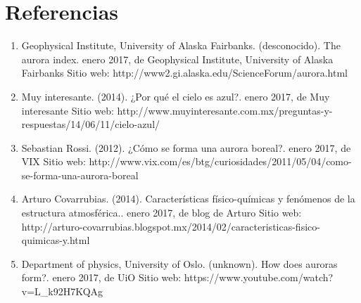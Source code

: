\documentclass{article}
\begin{document}
\section{Referencias}
\begin{doublespace}
\begin{enumerate}

\item Geophysical Institute, University of Alaska Fairbanks. (desconocido). The aurora index. enero 2017, de Geophysical Institute, University of Alaska Fairbanks Sitio web: http://www2.gi.alaska.edu/ScienceForum/aurora.html


\item Muy interesante. (2014). ¿Por qué el cielo es azul?. enero 2017, de Muy interesante Sitio web: http://www.muyinteresante.com.mx/preguntas-y-respuestas/14/06/11/cielo-azul/

\item Sebastian Rossi. (2012). ¿Cómo se forma una aurora boreal?. enero 2017, de VIX Sitio web: http://www.vix.com/es/btg/curiosidades/2011/05/04/como-se-forma-una-aurora-boreal

\item Arturo Covarrubias. (2014). Características físico-químicas y fenómenos de la estructura atmosférica.. enero 2017, de blog de Arturo Sitio web: http://arturo-covarrubias.blogspot.mx/2014/02/caracteristicas-fisico-quimicas-y.html

\item Department of physics, University of Oslo. (unknown). How does auroras form?. enero 2017, de UiO Sitio web: https://www.youtube.com/watch?v=L_k92H7KQAg



\end{enumerate}
\end{doublespace}
\end{document}
